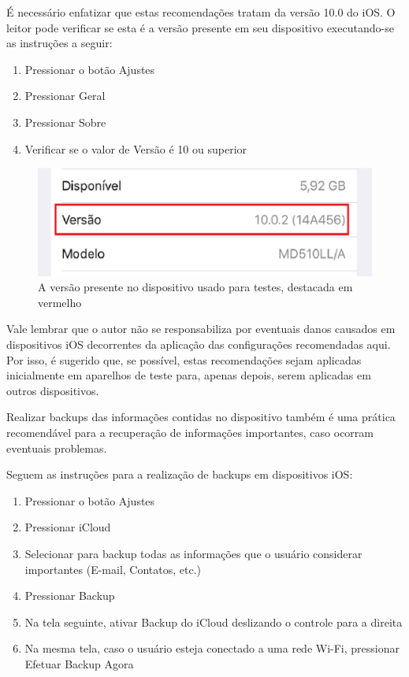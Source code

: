 \'E necess\'ario enfatizar que estas recomenda\c c\~oes tratam da vers\~ao 10.0 do iOS. O leitor pode verificar se esta \'e a vers\~ao presente em seu dispositivo executando-se as instru\c c\~oes a seguir:

\begin{enumerate}
\item Pressionar o bot\~ao Ajustes
\item Pressionar Geral
\item Pressionar Sobre
\item Verificar se o valor de Vers\~ao \'e 10 ou superior
\end{enumerate}

\begin{figure}[h]
  \centering
  \includegraphics{imagem5.eps}
  \caption{A vers\~ao presente no dispositivo usado para testes, destacada em vermelho}
\end{figure}

Vale lembrar que o autor n\~ao se responsabiliza por eventuais danos causados em dispositivos iOS decorrentes da aplica\c c\~ao das configura\c c\~oes recomendadas aqui. Por isso, \'e sugerido que, se poss\'ivel, estas recomenda\c c\~oes sejam aplicadas inicialmente em aparelhos de teste para, apenas depois, serem aplicadas em outros dispositivos. 

Realizar backups das informa\c c\~oes contidas no dispositivo tamb\'em \'e uma pr\'atica recomend\'avel para a recupera\c c\~ao de informa\c c\~oes importantes, caso ocorram eventuais problemas. 

\pagebreak

Seguem as instru\c c\~oes para a realiza\c c\~ao de backups em dispositivos iOS:

\begin{enumerate}
\item Pressionar o bot\~ao Ajustes
\item Pressionar iCloud
\item Selecionar para backup todas as informa\c c\~oes que o usu\'ario considerar importantes (E-mail, Contatos, etc.)
\item Pressionar Backup
\item Na tela seguinte, ativar Backup do iCloud deslizando o controle para a direita
\item Na mesma tela, caso o usu\'ario esteja conectado a uma rede Wi-Fi, pressionar Efetuar Backup Agora   
\end{enumerate}

